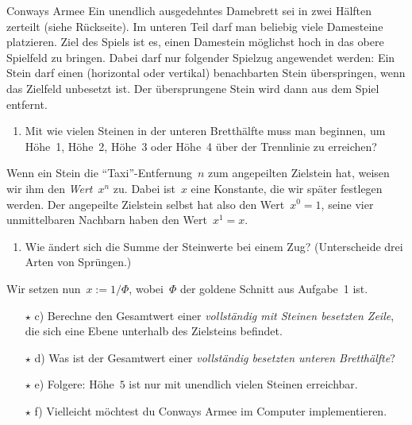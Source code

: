 \documentclass{zirkelblatt}
\begin{document}
\begin{aufgabe}{Conways Armee}
Ein unendlich ausgedehntes Damebrett sei in zwei Hälften zerteilt (siehe
Rückseite). Im unteren Teil darf man beliebig viele Damesteine platzieren. Ziel
des Spiels ist es, einen Damestein möglichst hoch in das obere Spielfeld zu
bringen. Dabei darf nur folgender Spielzug angewendet werden: Ein Stein
darf einen (horizontal oder vertikal) benachbarten Stein überspringen, wenn das
Zielfeld unbesetzt ist. Der übersprungene Stein wird dann aus dem Spiel
entfernt.
\begin{enumerate}
\item Mit wie vielen Steinen in der unteren Bretthälfte muss man beginnen, um
Höhe~1, Höhe~2, Höhe~3 oder Höhe~4 über der Trennlinie zu erreichen?
\end{enumerate}
Wenn ein Stein die
"`Taxi"'-Entfernung~$n$ zum angepeilten Zielstein hat, weisen wir ihm den \emph{Wert}~$x^n$ zu.
Dabei ist~$x$ eine Konstante, die wir später festlegen werden.
Der angepeilte Zielstein selbst hat also den Wert~$x^0 = 1$, seine vier
unmittelbaren Nachbarn haben den Wert~$x^1 = x$.
\begin{enumerate}
\addtocounter{enumi}{1}
\item Wie ändert sich die Summe der Steinwerte bei einem Zug? (Unterscheide drei Arten von Sprüngen.)
\end{enumerate}
Wir setzen nun~$x := 1/\Phi$, wobei~$\Phi$ der goldene Schnitt aus Aufgabe~1
ist.
\begin{enumerate}
\item[$\star$ c)] Berechne den Gesamtwert einer \emph{vollständig mit
Steinen besetzten Zeile}, die sich eine Ebene unterhalb des Zielsteins befindet.
\item[$\star$ d)] Was ist der Gesamtwert einer \emph{vollständig besetzten unteren Bretthälfte}?
\item[$\star$ e)] Folgere: Höhe~$5$ ist nur mit unendlich vielen Steinen
erreichbar.
\item[$\star$ f)] Vielleicht möchtest du Conways Armee im Computer implementieren.
\end{enumerate}
\end{aufgabe}

\newpage

\newcommand*{\xMin}{0}%
\newcommand*{\xMax}{6}%
\newcommand*{\yMin}{0}%
\newcommand*{\yMax}{6}%
\hspace*{-1.8cm}%
\end{document}
